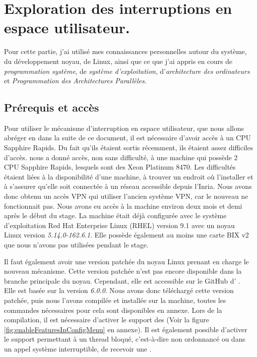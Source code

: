 \section{Exploration des interruptions en espace utilisateur.}
\label{sec:exploreUintr}

Pour cette partie, j'ai utilisé mes connaissances personnelles autour du système, du développement noyau, de Linux, ainsi que ce que j'ai appris en cours de \emph{programmation système}, de \emph{système d'exploitation}, d'\emph{architecture des ordinateurs} et \emph{Programmation des Architectures Parallèles}.

\subsection{Prérequis et accès}
\label{requirements}

Pour utiliser le mécanisme d'interruption en espace utilisateur, que nous allons abréger en \uintr{} dans la suite de ce document,
il est nécessaire d'avoir accès à un CPU \intel{} Sapphire Rapids.
Du fait qu'ils étaient sortis récemment, ils étaient assez difficiles d'accès.
\atos{} nous a donné accès, non sans difficulté, à une machine qui possède 2 CPU \intel{} Sapphire Rapids, lesquels sont des \intel{} Xeon\textsuperscript{\tiny{\textregistered}} Platinum 8470.
Les difficultés étaient liées à la disponibilité d'une machine, à trouver un endroit où l'installer et à s'assurer qu'elle soit connectée à un réseau accessible depuis l'Inria.
Nous avons donc obtenu un accès VPN qui utiliser l'ancien système VPN, car le nouveau ne fonctionnait pas.
Nous avons eu accès à la machine environ deux mois et demi après le début du stage.
La machine était déjà configurée avec le système d'exploitation Red Hat Enterprise Linux (RHEL) version 9.1 avec un noyau Linux version \emph{5.14.0-162.6.1}.
Elle possède également au moins une carte BIX v2 que nous n'avons pas utilisées pendant le stage. %

Il faut également avoir une version patchée du noyau Linux prenant en charge le nouveau mécanisme.
Cette version patchée n'est pas encore disponible dans la branche principale du noyau.
Cependant, elle est accessible sur le GitHub d'\intel{} \cite{intelUintrLinuxKernel}.
Elle est basée sur la version \emph{6.0.0}.
Nous avons donc téléchargé cette version patchée, puis nous l'avons compilée et installée sur la machine, toutes les commandes nécessaires pour cela sont disponibles en annexe.
Lors de la compilation, il est nécessaire d'activer le support des \uintr{} (Voir la figure \ref{fig:enableFeaturesInConfigMenu} en annexe).
Il est également possible d'activer le support permettant à un thread bloqué, c'est-à-dire non ordonnancé ou dans un appel système interruptible, de recevoir une \uintr{}.

